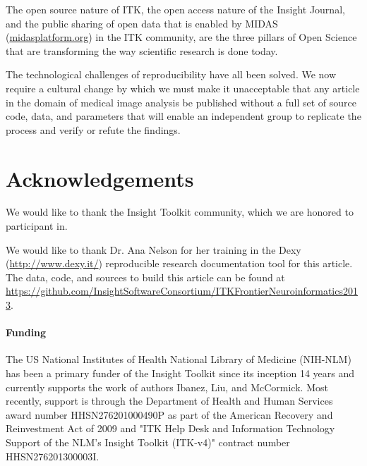 \documentclass{frontiersENG} %
\begin{document}
The open source nature of ITK, the open access nature of the Insight Journal,
and the public sharing of open data that is enabled by MIDAS
(\url{midasplatform.org}) in the ITK community, are the three pillars of Open
Science that are transforming the way scientific research is done today.

The technological challenges of reproducibility have all been solved. We now
require a cultural change by which we must make it unacceptable that any
article in the domain of medical image analysis be published without a full
set of source code, data, and parameters that will enable an independent group
to replicate the process and verify or refute the findings.

\section*{Acknowledgements}

We would like to thank the Insight Toolkit community, which we are honored to
participant in.

We would like to thank Dr. Ana Nelson for her training in the Dexy
(\url{http://www.dexy.it/}) reproducible research documentation tool for this
article.  The data, code, and sources to build this article can be found at
\url{https://github.com/InsightSoftwareConsortium/ITKFrontierNeuroinformatics2013}.

\paragraph{Funding\textcolon} The US National Institutes of Health National
Library of Medicine (NIH-NLM) has been a primary funder of the Insight Toolkit since
its inception 14 years and currently supports the work of authors Ibanez, Liu,
and McCormick. Most recently, support is through the Department of Health and Human
Services award number HHSN276201000490P as part of the American Recovery and
Reinvestment Act of 2009 and "ITK Help Desk and Information Technology Support
of the NLM's Insight Toolkit (ITK-v4)" contract number HHSN276201300003I.















\end{document}
